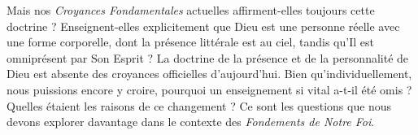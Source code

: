 Mais nos \textit{Croyances Fondamentales} actuelles affirment-elles toujours cette doctrine ? Enseignent-elles explicitement que Dieu est une personne réelle avec une forme corporelle, dont la présence littérale est au ciel, tandis qu'Il est omniprésent par Son Esprit ? La doctrine de la présence et de la personnalité de Dieu est absente des croyances officielles d'aujourd'hui. Bien qu'individuellement, nous puissions encore y croire, pourquoi un enseignement si vital a-t-il été omis ? Quelles étaient les raisons de ce changement ? Ce sont les questions que nous devons explorer davantage dans le contexte des \textit{Fondements de Notre Foi}.
